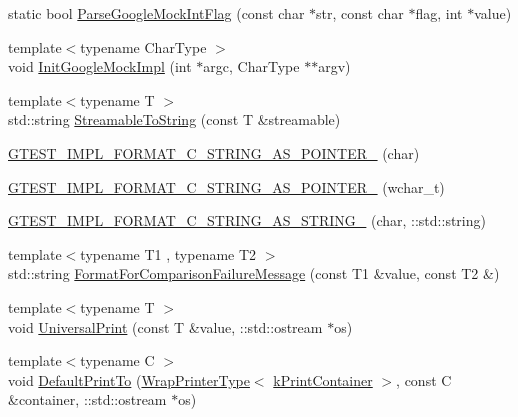 \begin{DoxyCompactItemize}
\item 
static bool \mbox{\hyperlink{namespacetesting_1_1internal_a5d201d5b16143a31fa16dc23b5d4af80}{Parse\+Google\+Mock\+Int\+Flag}} (const char $\ast$str, const char $\ast$flag, int $\ast$value)
\item 
{\footnotesize template$<$typename Char\+Type $>$ }\\void \mbox{\hyperlink{namespacetesting_1_1internal_a3823844199df88af9493026031cf7744}{Init\+Google\+Mock\+Impl}} (int $\ast$argc, Char\+Type $\ast$$\ast$argv)
\item 
{\footnotesize template$<$typename T $>$ }\\std\+::string \mbox{\hyperlink{namespacetesting_1_1internal_aad4beed95d0846e6ffc5da0978ef3bb9}{Streamable\+To\+String}} (const T \&streamable)
\item 
\mbox{\hyperlink{namespacetesting_1_1internal_a3682f962ae0ec1c0eca6444ca0a09e91}{G\+T\+E\+S\+T\+\_\+\+I\+M\+P\+L\+\_\+\+F\+O\+R\+M\+A\+T\+\_\+\+C\+\_\+\+S\+T\+R\+I\+N\+G\+\_\+\+A\+S\+\_\+\+P\+O\+I\+N\+T\+E\+R\+\_\+}} (char)
\item 
\mbox{\hyperlink{namespacetesting_1_1internal_a85e08f00d443221e529a0a85a90fbaeb}{G\+T\+E\+S\+T\+\_\+\+I\+M\+P\+L\+\_\+\+F\+O\+R\+M\+A\+T\+\_\+\+C\+\_\+\+S\+T\+R\+I\+N\+G\+\_\+\+A\+S\+\_\+\+P\+O\+I\+N\+T\+E\+R\+\_\+}} (wchar\+\_\+t)
\item 
\mbox{\hyperlink{namespacetesting_1_1internal_aeac30230dcc362221bdd07d61eaa4ec1}{G\+T\+E\+S\+T\+\_\+\+I\+M\+P\+L\+\_\+\+F\+O\+R\+M\+A\+T\+\_\+\+C\+\_\+\+S\+T\+R\+I\+N\+G\+\_\+\+A\+S\+\_\+\+S\+T\+R\+I\+N\+G\+\_\+}} (char, \+::std\+::string)
\item 
{\footnotesize template$<$typename T1 , typename T2 $>$ }\\std\+::string \mbox{\hyperlink{namespacetesting_1_1internal_a91ab078f10adc669f09b7f604975c518}{Format\+For\+Comparison\+Failure\+Message}} (const T1 \&value, const T2 \&)
\item 
{\footnotesize template$<$typename T $>$ }\\void \mbox{\hyperlink{namespacetesting_1_1internal_a30708fa2bacf11895b03bdb21eb72309}{Universal\+Print}} (const T \&value, \+::std\+::ostream $\ast$os)
\item 
{\footnotesize template$<$typename C $>$ }\\void \mbox{\hyperlink{namespacetesting_1_1internal_a2e96c98d5bd8ee4a1b92f8e3cde7dd40}{Default\+Print\+To}} (\mbox{\hyperlink{structtesting_1_1internal_1_1WrapPrinterType}{Wrap\+Printer\+Type}}$<$ \mbox{\hyperlink{namespacetesting_1_1internal_a17fb8f0125fa92404a249ed38a43faa4a945a19e59155ce1d335e8c3bcbdf61db}{k\+Print\+Container}} $>$, const C \&container, \+::std\+::ostream $\ast$os)
$$
\end{DoxyCompactItemize}
